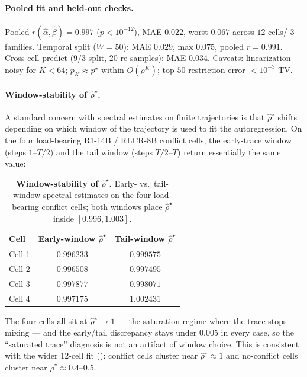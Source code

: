 \paragraph{Pooled fit and held-out checks.}
Pooled $r(\widehat\alpha,\widehat\beta)\!=\!0.997$
($p\!<\!10^{-12}$), MAE $0.022$, worst $0.067$ across $12$ cells/
$3$ families.  Temporal split ($W\!=\!50$): MAE $0.029$, max $0.075$,
pooled $r\!=\!0.991$.  Cross-cell predict ($9/3$ split, $20$
re-samples): MAE $0.034$.  Caveats: linearization noisy for
$K\!<\!64$; $p_K\!\approx\!p^\star$ within $O(\rho^K)$; top-$50$
restriction error $<\!10^{-3}$ TV.

\paragraph{Window-stability of $\widehat\rho^\star$.}
A standard concern with spectral estimates on finite trajectories
is that $\widehat\rho^\star$ shifts depending on which window of
the trajectory is used to fit the autoregression.  On the four
load-bearing R1-14B / RLCR-8B conflict cells, the early-trace
window (steps $1$--$T/2$) and the tail window (steps $T/2$--$T$)
return essentially the same value:

\begin{table}[H]
\centering\small
\caption{\textbf{Window-stability of $\widehat\rho^\star$.}
Early- vs.\ tail-window spectral estimates on the four
load-bearing conflict cells; both windows place
$\widehat\rho^\star$ inside $[0.996,1.003]$.}
\label{tab:rho-window-stability}
\setlength{\tabcolsep}{6pt}
\begin{tabular}{lcc}
\toprule
\textbf{Cell} & \textbf{Early-window $\widehat\rho^\star$} & \textbf{Tail-window $\widehat\rho^\star$}\\
\midrule
Cell 1 & $0.996233$ & $0.999575$\\
Cell 2 & $0.996508$ & $0.997495$\\
Cell 3 & $0.997877$ & $0.998071$\\
Cell 4 & $0.997175$ & $1.002431$\\
\bottomrule
\end{tabular}
\end{table}

The four cells all sit at $\widehat\rho^\star\!\to\!1$ — the
saturation regime where the trace stops mixing — and the
early/tail discrepancy stays under $0.005$ in every case, so the
``saturated trace'' diagnosis is not an artifact of window
choice.  This is consistent with the wider $12$-cell fit
(): conflict cells cluster
near $\widehat\rho^\star\!\approx\!1$ and no-conflict cells
cluster near $\widehat\rho^\star\!\approx\!0.4$--$0.5$.


